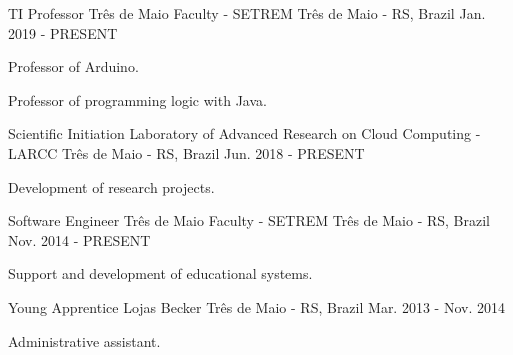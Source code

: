 
\begin{cventries}
  \cventry
  {TI Professor} %
  {Três de Maio Faculty - SETREM} %
  {Três de Maio - RS, Brazil} %
  {Jan. 2019 - PRESENT} %
  {
    \begin{cvitems} %
      \item {Professor of Arduino.}
      \item {Professor of programming logic with Java.}
    \end{cvitems}
  }

  \cventry
  {Scientific Initiation} %
  {Laboratory of Advanced Research on Cloud Computing - LARCC} %
  {Três de Maio - RS, Brazil} %
  {Jun. 2018 - PRESENT} %
  {
    \begin{cvitems} %
      \item {Development of research projects.}
    \end{cvitems}
  }

  \cventry
  {Software Engineer} %
  {Três de Maio Faculty - SETREM} %
  {Três de Maio - RS, Brazil} %
  {Nov. 2014 - PRESENT} %
  {
    \begin{cvitems} %
      \item {Support and development of educational systems.}
    \end{cvitems}
  }

  \cventry
  {Young Apprentice} %
  {Lojas Becker} %
  {Três de Maio - RS, Brazil} %
  {Mar. 2013 - Nov. 2014} %
  {
    \begin{cvitems} %
      \item {Administrative assistant.}
    \end{cvitems}
  }
\end{cventries}

